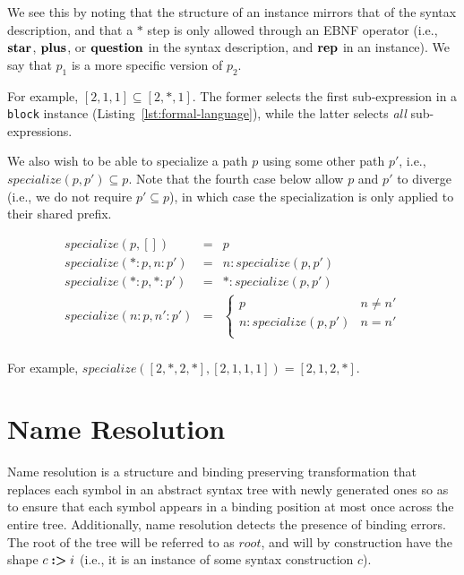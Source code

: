 \documentclass{kththesis}
\begin{document}
We see this by noting that the structure of an instance mirrors that of the syntax description, and that a $*$ step is only allowed through an EBNF operator (i.e., $\mathrel{\mathbf{star}}$, $\mathrel{\mathbf{plus}}$, or $\mathrel{\mathbf{question}}$ in the syntax description, and $\mathrel{\mathbf{rep}}$ in an instance). We say that $p_1$ is a more specific version of $p_2$.

For example, $[2, 1, 1] \subseteq [2, *, 1]$. The former selects the first sub-expression in a \texttt{block} instance (Listing~\ref{lst:formal-language}), while the latter selects \emph{all} sub-expressions.

\newcommand{\specialize}{\ensuremath{\mathit{specialize}}}

We also wish to be able to specialize a path $p$ using some other path $p'$, i.e., $\specialize(p, p') \subseteq p$. Note that the fourth case below allow $p$ and $p'$ to diverge (i.e., we do not require $p' \subseteq p$), in which case the specialization is only applied to their shared prefix.

$$
\begin{array}{rcl}
\specialize(p, []) & = & p \\
\specialize(*:p, n:p') & = & n : \specialize(p, p') \\
\specialize(*:p, *:p') & = & * : \specialize(p, p') \\
\specialize(n:p, n':p') & = &
\begin{cases}
  p & n \neq n' \\
  n : \specialize(p, p') & n = n' \\
\end{cases} \\
\end{array}
$$

For example, $\specialize([2, *, 2, *], [2, 1, 1, 1]) = [2, 1, 2, *]$.

\section{Name Resolution} \label{sec:name-resolution}

\newcommand{\rooti}{\ensuremath{\mathit{root}}}

Name resolution is a structure and binding preserving transformation that replaces each symbol in an abstract syntax tree with newly generated ones so as to ensure that each symbol appears in a binding position at most once across the entire tree. Additionally, name resolution detects the presence of binding errors. The root of the tree will be referred to as \rooti, and will by construction have the shape $c \mathrel{\textbf{:>}} i$ (i.e., it is an instance of some syntax construction $c$).
\end{document}
